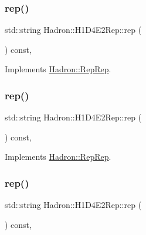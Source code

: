 \subsubsection{\texorpdfstring{rep()}{rep()}\hspace{0.1cm}{\footnotesize\ttfamily [2/5]}}
{\footnotesize\ttfamily std\+::string Hadron\+::\+H1\+D4\+E2\+Rep\+::rep (\begin{DoxyParamCaption}{ }\end{DoxyParamCaption}) const\hspace{0.3cm}{\ttfamily [inline]}, {\ttfamily [virtual]}}



Implements \mbox{\hyperlink{structHadron_1_1RepRep_ab3213025f6de249f7095892109575fde}{Hadron\+::\+Rep\+Rep}}.

\mbox{\label{structHadron_1_1H1D4E2Rep_a21042b3f507f32a467b776db77aa093f}} 
\subsubsection{\texorpdfstring{rep()}{rep()}\hspace{0.1cm}{\footnotesize\ttfamily [3/5]}}
{\footnotesize\ttfamily std\+::string Hadron\+::\+H1\+D4\+E2\+Rep\+::rep (\begin{DoxyParamCaption}{ }\end{DoxyParamCaption}) const\hspace{0.3cm}{\ttfamily [inline]}, {\ttfamily [virtual]}}



Implements \mbox{\hyperlink{structHadron_1_1RepRep_ab3213025f6de249f7095892109575fde}{Hadron\+::\+Rep\+Rep}}.

\mbox{\label{structHadron_1_1H1D4E2Rep_a21042b3f507f32a467b776db77aa093f}} 
\subsubsection{\texorpdfstring{rep()}{rep()}\hspace{0.1cm}{\footnotesize\ttfamily [4/5]}}
{\footnotesize\ttfamily std\+::string Hadron\+::\+H1\+D4\+E2\+Rep\+::rep (\begin{DoxyParamCaption}{ }\end{DoxyParamCaption}) const\hspace{0.3cm}{\ttfamily [inline]}, {\ttfamily [virtual]}}




